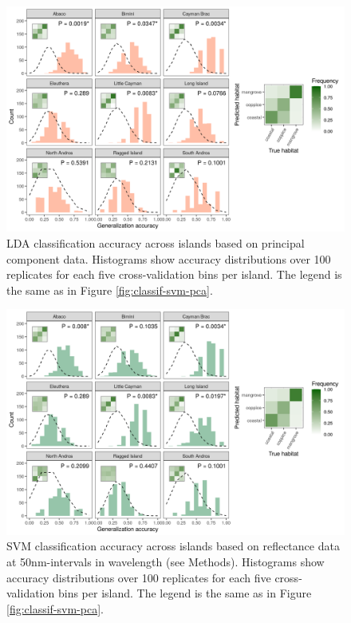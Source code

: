 \begin{figure}[H]
	\centering
	\includegraphics[width=\textwidth]{"../analyses/04-machine learning/plots/classif_lda_pca"}
	\caption{LDA classification accuracy across islands based on principal component data. Histograms show accuracy distributions over 100 replicates for each five cross-validation bins per island. The legend is the same as in Figure \ref{fig:classif-svm-pca}.}
	\label{supfig:classif-lda-pca}
\end{figure}

\begin{figure}[H]
	\centering
	\includegraphics[width=\textwidth]{"../analyses/04-machine learning/plots/classif_svm_refl"}
	\caption{SVM classification accuracy across islands based on reflectance data at 50nm-intervals in wavelength (see Methods). Histograms show accuracy distributions over 100 replicates for each five cross-validation bins per island. The legend is the same as in Figure \ref{fig:classif-svm-pca}.}
	\label{supfig:classif-svm-refl}
\end{figure}

